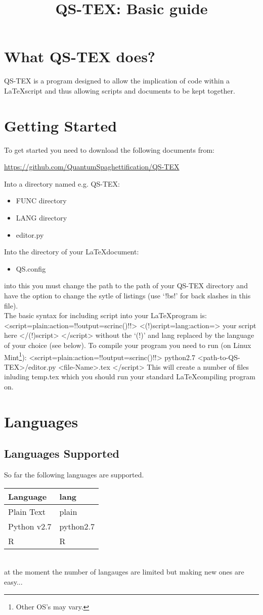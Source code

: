 \documentclass[a4paper,12pt,twocolum]{article}
\title{QS-TEX: Basic guide}
\begin{document}
\maketitle
\section{What QS-TEX does?}
QS-TEX is a program designed to allow the implication of code within a \LaTeX  script and thus allowing scripts and documents to be kept together. 
\section{Getting Started}
To get started you need to download the following documents from:
\begin{center} \url{https://github.com/QuantumSpaghettification/QS-TEX} \end{center}
Into a directory named e.g. QS-TEX:
\begin{itemize}
\item FUNC directory
\item LANG directory
\item editor.py
\end{itemize}
Into the directory of your \LaTeX  document:
\begin{itemize}
\item QS.config
\end{itemize}
into this you must change the path to the path of your QS-TEX directory and have the option to change the sytle of listings (use `!bs!' for back slashes in this file).\\
The basic syntax for including script into your \LaTeX  program is:
<script=plain:action={!!output=scrinc()!!}>
<(!)script=lang:action={}>
your script here
</(!)script>
</script>
without the `(!)' and lang replaced by the language of your choice (see below). To compile your program you need to run (on Linux Mint\footnote{Other OS's may vary.}):
<script=plain:action={!!output=scrinc()!!}>
python2.7 <path-to-QS-TEX>/editor.py <file-Name>.tex
</script>
This will create a number of files inluding temp.tex which you should run your standard \LaTeX compiling program on.
\section{Languages}
\subsection{Languages Supported}
So far the following languages are supported.\\
\begin{tabular}{|p{1.5in}|p{1.5in}|}
\hline 
\textbf{Language} & \textbf{lang}\\
\hline
Plain Text & plain\\ \hline
Python v2.7 & python2.7\\ \hline
R & R\\ \hline
\end{tabular}
\\
at the moment the number of langauges are limited but making new ones are easy...
\end{document}
